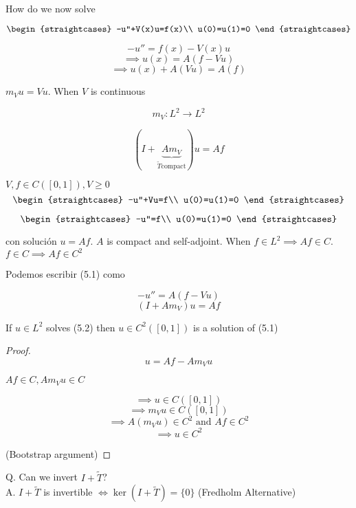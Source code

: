 How do we now solve 

\[\begin{straightcases}
    -u''+V(x)u=f(x)\\
    u(0)=u(1)=0
\end{straightcases}\]

\[-u''=f(x)-V(x)u\]
\[\implies u(x)=A(f-Vu)\]
\[\implies u(x)+A(Vu)=A(f)\]

$m_V u= Vu$. When $V$ is continuous

\[m_V:L^2\to L^2\]

\[(I+\underbrace{Am_V}_{\tilde T \text{compact}})u=Af\]


$V,f\in C([0,1]),V\geq 0$
\begin{equation}\begin{straightcases}
    -u''+Vu=f\\
    u(0)=u(1)=0
\end{straightcases}\end{equation}

\[\begin{straightcases}
    -u''=f\\
    u(0)=u(1)=0
\end{straightcases}\]

con solución $u=Af$. $A$ is compact and self-adjoint. When $f\in L^2\implies Af\in C$. $f\in C\implies Af\in C^2$

Podemos escribir (5.1) como 

$$-u''=A(f-Vu)$$
\begin{equation}(I+Am_V)u=Af\end{equation}

\begin{fproposition}
    If $u\in L^2$ solves (5.2) then $u\in C^2([0,1])$ is a solution of (5.1)
\end{fproposition}

\begin{proof}
    \[u=Af-Am_V u\]

    $Af\in C, Am_V u\in C$

    \[\implies u\in C([0,1])\]
    \[\implies m_V u\in C([0,1])\]
    \[\implies A(m_V u)\in C^2\text{ and }Af\in C^2\]
    \[\implies u\in C^2\]

    (Bootstrap argument)
\end{proof}

Q. Can we invert $I+\tilde T$?\\
A. $I+\tilde T$ is invertible $\iff \ker (I+\tilde T)=\{0\}$ (Fredholm Alternative)

